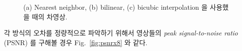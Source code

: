 \documentclass[a4paper, 12p]{paper}
\begin{document}
\begin{figure}[H]
{}
\caption{(a) Nearest neighbor, (b) bilinear, (c) bicubic interpolation 을 사용했을 때의 차영상.}
\label{fig:diff}
\end{figure}

각 방식의 오차를 정량적으로 파악하기 위해서 영상들의 \textit{peak signal-to-noise ratio} (PSNR) 를 구해볼 경우 Fig.~\ref{fig:psnrx8} 와 같다.
\end{document}
